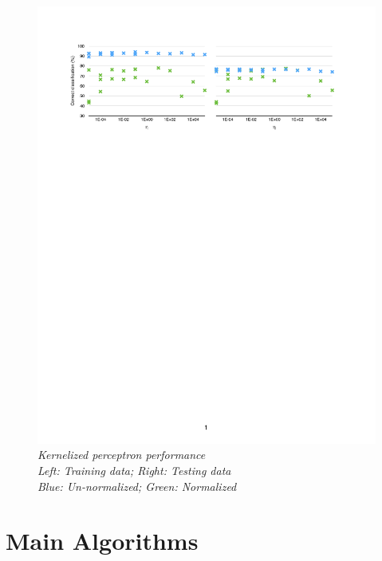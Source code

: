 \documentclass{article} %
\begin{document}
\begin                  {figure}
\begin                  {center}
\includegraphics        [scale = 0.6]
                        {fig1.pdf}
\caption                {\small\textit{Kernelized perceptron performance\\Left: Training data; Right: Testing data\\Blue: Un-normalized; Green: Normalized}}
\label                  {fig:fig1}
\end                    {center}
\end                    {figure}


\section{Main Algorithms}
\label{sec:main_algorithms}
\end{document}
